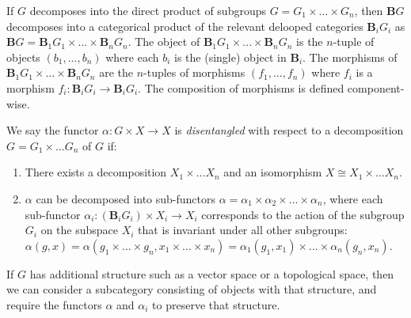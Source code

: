 If $G$ decomposes into the direct product of subgroups $G = G_{1} \times ... \times G_{n}$, then $\textbf{B}G$ decomposes into a categorical product of the relevant delooped categories $\textbf{B}_{i}G_{i}$ as $\textbf{B}G = \textbf{B}_{1}G_{1} \times ... \times \textbf{B}_{n}G_{n}$.
The object of $\textbf{B}_{1}G_{1} \times ... \times \textbf{B}_{n}G_{n}$ is the $n$-tuple of objects $(b_{1},...,b_{n})$ where each $b_{i}$ is the (single) object in $\textbf{B}_{i}$.
The morphisms of $\textbf{B}_{1}G_{1} \times ... \times \textbf{B}_{n}G_{n}$ are the $n$-tuples of morphisms $(f_{1}, ..., f_{n})$ where $f_{i}$ is a morphism $f_{i}: \textbf{B}_{i}G_{i} \to \textbf{B}_{i}G_{i}$.
The composition of morphisms is defined component-wise.

We say the functor $\alpha: G \times X \to X$ is \textit{disentangled} with respect to a decomposition $G = G_{1} \times ... G_{n}$ of $G$ if:
\begin{enumerate}
    \item There exists a decomposition $X_{1} \times ... X_{n}$ and an isomorphism $X \cong X_{1} \times ... X_{n}$.

    \item $\alpha$ can be decomposed into sub-functors $\alpha = \alpha_{1} \times \alpha_{2} \times ... \times \alpha_{n}$, where each sub-functor $\alpha_{i}: (\textbf{B}_{i}G_{i}) \times X_{i} \to X_{i}$ corresponds to the action of the subgroup $G_{i}$ on the subspace $X_{i}$ that is invariant under all other subgroups: $\alpha(g, x) = \alpha(g_{1} \times ... \times g_{n}, x_{1} \times ... \times x_{n}) = \alpha_{1}(g_{1}, x_{1}) \times ... \times \alpha_{n}(g_{n}, x_{n})$.
\end{enumerate}

If $G$ has additional structure such as a vector space or a topological space, then we can consider a subcategory  consisting of objects with that structure, and require the functors $\alpha$ and $\alpha_{i}$ to preserve that structure.


